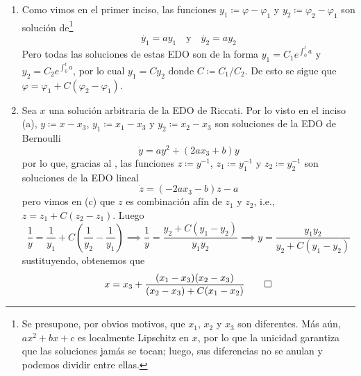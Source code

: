 \begin{sol}
\begin{enumerate}[label = (\alph*)]
\begin{align*}
        y(t)%
        &= e^{\frac23(t^3 - t_0^3)} \cdot \left(
           y_0^{-1} - \int^{t}_{t_0} e^{\frac23(s^3 - t_0^3)}\,\mathrm{d}s
        \right)^{-1}\\
        &= \left(%
            e^{\frac23(t_0^3 - t^3)}y_0^{-1} - e^{-\frac23t^3} \int^{t}_{t_0} e^{\frac23s^3} \,\mathrm{d}s
        \right)^{-1}
    \end{align*}
    Por lo que la solución $x$ de la EDO de Riccati que pasa por un punto $(t_0, x_0)$ queda 
    \[
        x(t) = t^2 + 1 + \left(%
            e^{\frac23(t_0^3 - t^3)}(x_0 - t_0^2 - 1)^{-1} - e^{-\frac23t^3} \int^{t}_{t_0} e^{\frac23s^3} \,\mathrm{d}s
        \right)^{-1}
    \]
    Notemos que la integral $\int^{t}_{t_0} e^{\frac23s^3}\mathrm{d}s$ no tiene expresión elemental, se tendría que expresar usando funciones especiales, por lo que es más sencillo dejarla sin desarrollar.

    \item Como vimos en el primer inciso, las funciones $y_1 \coloneq \varphi - \varphi_1$ y $y_2 \coloneq \varphi_2 - \varphi_1$ son solución de\footnote{Se presupone, por obvios motivos, que $x_1$, $x_2$ y $x_3$ son diferentes. Más aún, $ax^2 + bx + c$ es localmente Lipschitz en $x$, por lo que la unicidad garantiza que las soluciones jamás se tocan; luego, sus diferencias no se anulan y podemos dividir entre ellas.}
    \[
        \dot{y_1} = ay_1 \quad\text{y}\quad \dot{y_2} = ay_2
    \]
    Pero todas las soluciones de estas EDO son de la forma $y_1 = C_1 e^{\int^t_0 a}$ y $y_2 = C_2 e^{\int^t_0 a}$, por lo cual $y_1 = C y_2$ donde $C \coloneq C_1/C_2$. De esto se sigue que $\varphi = \varphi_1 + C(\varphi_2 - \varphi_1)$.

    \item Sea $x$ una solución arbitraria de la EDO de Riccati. Por lo visto en el inciso (a), $y \coloneq x - x_3$, $y_1 \coloneq x_1 - x_3$ y $y_2 \coloneq x_2 - x_3$ son soluciones de la EDO de Bernoulli
    \[
        \dot{y} = ay^2 + (2ax_3 + b)y
    \]
    por lo que, gracias al , las funciones $z \coloneq y^{-1}$, $z_1 \coloneq y_1^{-1}$ y $z_2 \coloneq y_2^{-1}$ son soluciones de la EDO lineal
    \[
        \dot{z} = (-2ax_3 - b)z -a
    \]
    pero vimos en (c) que $z$ es combinación afín de $z_1$ y $z_2$, i.e., $z = z_1 + C(z_2 - z_1)$. Luego
    \[
        \frac1y = \frac{1}{y_1} + C\left( \frac{1}{y_2} - \frac{1}{y_1} \right)%
        \implies \frac1y = \frac{y_2 + C(y_1 - y_2)}{y_1y_2}%
        \implies y = \frac{y_1y_2}{y_2 + C(y_1 - y_2)}
    \]
    sustituyendo, obtenemos que
    \[
        x = x_3 + \frac{(x_1 - x_3)(x_2 - x_3)}{(x_2 - x_3) + C(x_1 - x_2)}\qedhere
    \]
\end{enumerate}
\end{sol}



